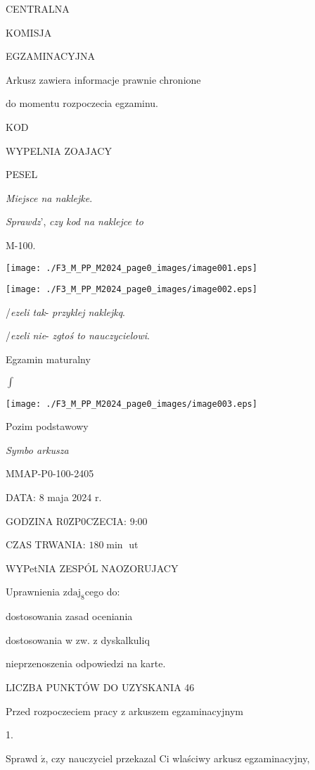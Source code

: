 \documentclass[a4paper,12pt]{article}
\begin{document}
CENTRALNA

KOMISJA

EGZAMINACYJNA

Arkusz zawiera informacje prawnie chronione

do momentu rozpoczecia egzaminu.

KOD

WYPELNIA ZOAJACY

PESEL

{\it Miejsce na naklejke}.

{\it Sprawdz}', {\it czy kod na naklejce to}

M-100.
\begin{center}
\texttt{[image: ./F3\_M\_PP\_M2024\_page0\_images/image001.eps]}

\texttt{[image: ./F3\_M\_PP\_M2024\_page0\_images/image002.eps]}
\end{center}
/{\it ezeli tak}- {\it przyklej naklejkq}.

/{\it ezeli nie}- {\it zgtoś to nauczycielowi}.

Egzamin maturalny

$\displaystyle \int$
\begin{center}
\texttt{[image: ./F3\_M\_PP\_M2024\_page0\_images/image003.eps]}
\end{center}
$\mathrm{P}\mathrm{o}\mathrm{z}\mathrm{i}$\fcircle$\mathrm{m}$  podstawowy

{\it Symbo arkusza}

MMAP-P0-100-2405

DATA: 8 maja 2024 r.

GODZINA R0ZP0CZECIA: 9:00

CZAS TRWANIA: $180 \displaystyle \min$ ut

WYPetNIA ZESPÓL NAOZORUJACY

Uprawnienia $\mathrm{z}\mathrm{d}\mathrm{a}\mathrm{j}_{8}$cego do:

\fbox{} dostosowania zasad oceniania

\fbox{} dostosowania w zw. z dyskalkuliq

\fbox{} nieprzenoszenia odpowiedzi na karte.

LICZBA PUNKTÓW DO UZYSKANIA 46

Przed rozpoczeciem pracy z arkuszem egzaminacyjnym

1.

Sprawd $\acute{\mathrm{z}}$, czy nauczyciel przekazal Ci wlaściwy arkusz egzaminacyjny,
\end{document}
